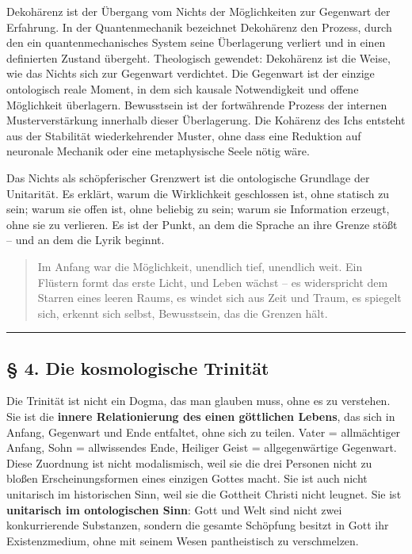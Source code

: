 \documentclass[
  ngerman,
]{article}
\begin{document}
Dekohärenz ist der Übergang vom Nichts der Möglichkeiten zur Gegenwart
der Erfahrung. In der Quantenmechanik bezeichnet Dekohärenz den Prozess,
durch den ein quantenmechanisches System seine Überlagerung verliert und
in einen definierten Zustand übergeht. Theologisch gewendet: Dekohärenz
ist die Weise, wie das Nichts sich zur Gegenwart verdichtet. Die
Gegenwart ist der einzige ontologisch reale Moment, in dem sich kausale
Notwendigkeit und offene Möglichkeit überlagern. Bewusstsein ist der
fortwährende Prozess der internen Musterverstärkung innerhalb dieser
Überlagerung. Die Kohärenz des Ichs entsteht aus der Stabilität
wiederkehrender Muster, ohne dass eine Reduktion auf neuronale Mechanik
oder eine metaphysische Seele nötig wäre.

Das Nichts als schöpferischer Grenzwert ist die ontologische Grundlage
der Unitarität. Es erklärt, warum die Wirklichkeit geschlossen ist, ohne
statisch zu sein; warum sie offen ist, ohne beliebig zu sein; warum sie
Information erzeugt, ohne sie zu verlieren. Es ist der Punkt, an dem die
Sprache an ihre Grenze stößt -- und an dem die Lyrik beginnt.

\begin{quote}
Im Anfang war die Möglichkeit, unendlich tief, unendlich weit. Ein
Flüstern formt das erste Licht, und Leben wächst -- es widerspricht dem
Starren eines leeren Raums, es windet sich aus Zeit und Traum, es
spiegelt sich, erkennt sich selbst, Bewusstsein, das die Grenzen hält.
\end{quote}

\begin{center}\rule{0.5\linewidth}{0.5pt}\end{center}

\subsection{§ 4. Die kosmologische
Trinität}\label{die-kosmologische-trinituxe4t}

Die Trinität ist nicht ein Dogma, das man glauben muss, ohne es zu
verstehen. Sie ist die \textbf{innere Relationierung des einen
göttlichen Lebens}, das sich in Anfang, Gegenwart und Ende entfaltet,
ohne sich zu teilen. Vater = allmächtiger Anfang, Sohn = allwissendes
Ende, Heiliger Geist = allgegenwärtige Gegenwart. Diese Zuordnung ist
nicht modalismisch, weil sie die drei Personen nicht zu bloßen
Erscheinungsformen eines einzigen Gottes macht. Sie ist auch nicht
unitarisch im historischen Sinn, weil sie die Gottheit Christi nicht
leugnet. Sie ist \textbf{unitarisch im ontologischen Sinn}: Gott und
Welt sind nicht zwei konkurrierende Substanzen, sondern die gesamte
Schöpfung besitzt in Gott ihr Existenzmedium, ohne mit seinem Wesen
pantheistisch zu verschmelzen.
\end{document}
